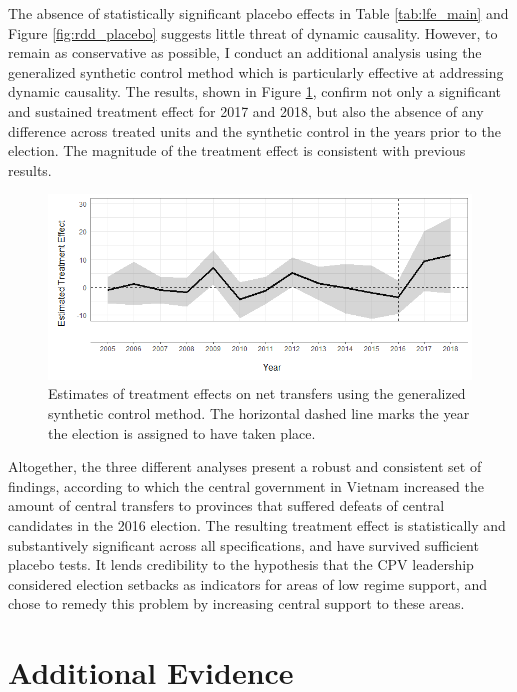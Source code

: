 \documentclass[12pt]{article}
\newcommand{\1}{\mathbbm{1}}
\begin{document}
The absence of statistically significant placebo effects in Table \ref{tab:lfe_main} and Figure \ref{fig:rdd_placebo} suggests little threat of dynamic causality. However, to remain as conservative as possible, I conduct an additional analysis using the generalized synthetic control method \citep{Xu2017gsynth} which is particularly effective at addressing dynamic causality. The results, shown in Figure \ref{fig:synth_placebo}, confirm not only a significant and sustained treatment effect for 2017 and 2018, but also the absence of any difference across treated units and the synthetic control in the years prior to the election. The magnitude of the treatment effect is consistent with previous results.

\begin{figure}[!htbp]
	\centering
	\includegraphics[width=\textwidth]{figure/190618_synth_results.png}
	\captionsetup{singlelinecheck=off}
	\caption[Estimated synthetic control treatment effects]{Estimates of treatment effects on net transfers using the generalized synthetic control method. The horizontal dashed line marks the year the election is assigned to have taken place.}
	\label{fig:synth_placebo}
\end{figure}

Altogether, the three different analyses present a robust and consistent set of findings, according to which the central government in Vietnam increased the amount of central transfers to provinces that suffered defeats of central candidates in the 2016 election. The resulting treatment effect is statistically and substantively significant across all specifications, and have survived sufficient placebo tests. It lends credibility to the hypothesis that the CPV leadership considered election setbacks as indicators for areas of low regime support, and chose to remedy this problem by increasing central support to these areas.

\section{Additional Evidence}
\label{sec:additional}
\end{document}
